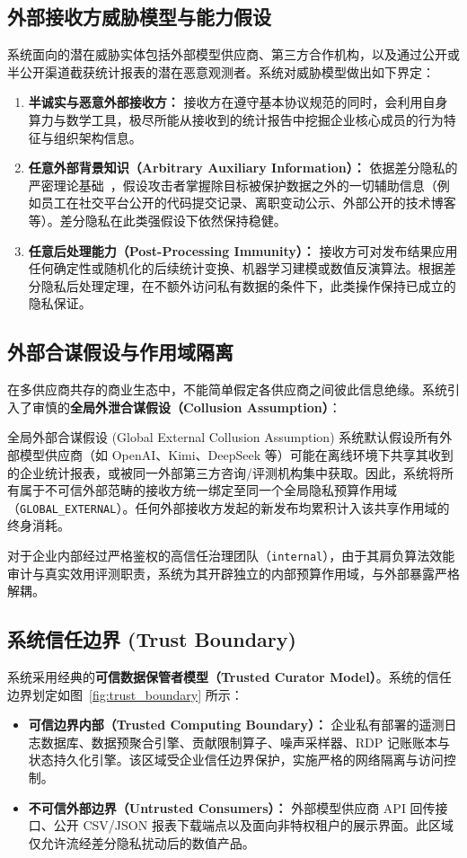 \subsection{外部接收方威胁模型与能力假设}
系统面向的潜在威胁实体包括外部模型供应商、第三方合作机构，以及通过公开或半公开渠道截获统计报表的潜在恶意观测者。系统对威胁模型做出如下界定：
\begin{enumerate}[label=(\alph*), leftmargin=2.5em]
  \item \textbf{半诚实与恶意外部接收方：} 接收方在遵守基本协议规范的同时，会利用自身算力与数学工具，极尽所能从接收到的统计报告中挖掘企业核心成员的行为特征与组织架构信息。
  \item \textbf{任意外部背景知识（Arbitrary Auxiliary Information）：} 依据差分隐私的严密理论基础~\cite{dwork2006calibrating}，假设攻击者掌握除目标被保护数据之外的一切辅助信息（例如员工在社交平台公开的代码提交记录、离职变动公示、外部公开的技术博客等）。差分隐私在此类强假设下依然保持稳健。
  \item \textbf{任意后处理能力（Post-Processing Immunity）：} 接收方可对发布结果应用任何确定性或随机化的后续统计变换、机器学习建模或数值反演算法。根据差分隐私后处理定理，在不额外访问私有数据的条件下，此类操作保持已成立的隐私保证。
\end{enumerate}

\subsection{外部合谋假设与作用域隔离}
在多供应商共存的商业生态中，不能简单假定各供应商之间彼此信息绝缘。系统引入了审慎的\textbf{全局外泄合谋假设（Collusion Assumption）}：
\begin{techbox}{全局外部合谋假设 (Global External Collusion Assumption)}
系统默认假设所有外部模型供应商（如 OpenAI、Kimi、DeepSeek 等）可能在离线环境下共享其收到的企业统计报表，或被同一外部第三方咨询/评测机构集中获取。因此，系统将所有属于不可信外部范畴的接收方统一绑定至同一个全局隐私预算作用域（\texttt{GLOBAL\_EXTERNAL}）。任何外部接收方发起的新发布均累积计入该共享作用域的终身消耗。
\end{techbox}

对于企业内部经过严格鉴权的高信任治理团队（\texttt{internal}），由于其肩负算法效能审计与真实效用评测职责，系统为其开辟独立的内部预算作用域，与外部暴露严格解耦。

\subsection{系统信任边界 (Trust Boundary)}
系统采用经典的\textbf{可信数据保管者模型（Trusted Curator Model）}。系统的信任边界划定如图~\ref{fig:trust_boundary} 所示：
\begin{itemize}[leftmargin=2em]
  \item \textbf{可信边界内部（Trusted Computing Boundary）：} 企业私有部署的遥测日志数据库、数据预聚合引擎、贡献限制算子、噪声采样器、RDP 记账账本与状态持久化引擎。该区域受企业信任边界保护，实施严格的网络隔离与访问控制。
  \item \textbf{不可信外部边界（Untrusted Consumers）：} 外部模型供应商 API 回传接口、公开 CSV/JSON 报表下载端点以及面向非特权租户的展示界面。此区域仅允许流经差分隐私扰动后的数值产品。
\end{itemize}

